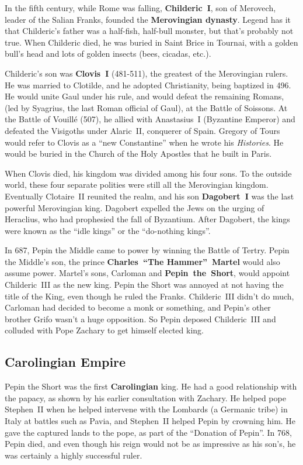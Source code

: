 In the fifth century, while Rome was falling,
\textbf{Childeric~I}, son of Merovech, leader of the Salian Franks, founded the \textbf{Merovingian dynasty}.
Legend has it that Childeric's father was a half-fish, half-bull monster, but that's probably not true.
When Childeric died, he was buried in Saint Brice in Tournai,
with a golden bull's head and lots of golden insects (bees, cicadas, etc.).

Childeric's son was \textbf{Clovis~I} (481-511), the greatest of the Merovingian rulers.
He was married to Clotilde, and he adopted Christianity, being baptized in 496.
He would unite Gaul under his rule, and would defeat the remaining Romans,
(led by Syagrius, the last Roman official of Gaul), at the Battle of Soissons.
At the Battle of Vouill\'e (507), he allied with Anastasius~I (Byzantine Emperor)
and defeated the Visigoths under Alaric~II, conquerer of Spain.
Gregory of Tours would refer to Clovis as a ``new Constantine'' when he wrote his \textit{Histories}.
He would be buried in the Church of the Holy Apostles that he built in Paris.

When Clovis died, his kingdom was divided among his four sons.
To the outside world, these four separate polities were still all the Merovingian kingdom.
Eventually Clotaire~II reunited the realm, and his son \textbf{Dagobert~I} was the last powerful Merovingian king.
Dagobert expelled the Jews on the urging of Heraclius, who had prophesied the fall of Byzantium.
After Dagobert, the kings were known as the ``idle kings'' or the ``do-nothing kings''.

In 687, Pepin the Middle came to power by winning the Battle of Tertry.
Pepin the Middle's son, the prince \textbf{Charles~``The Hammer''~Martel} would also assume power.
Martel's sons, Carloman and \textbf{Pepin~the~Short}, would appoint Childeric~III as the new king.
Pepin the Short was annoyed at not having the title of the King, even though he ruled the Franks.
Childeric~III didn't do much, Carloman had decided to become a monk or something,
and Pepin's other brother Grifo wasn't a huge opposition.
So Pepin deposed Childeric~III and colluded with Pope Zachary to get himself elected king.

\subsection*{Carolingian Empire}

Pepin the Short was the first \textbf{Carolingian} king.
He had a good relationship with the papacy, as shown by his earlier consultation with Zachary.
He helped pope Stephen~II when he helped intervene with the Lombards (a Germanic tribe)
in Italy at battles such as Pavia,
and Stephen~II helped Pepin by crowning him.
He gave the captured lands to the pope, as part of the ``Donation of Pepin''.
In 768, Pepin died, and even though his reign would not be as impressive as his son's,
he was certainly a highly successful ruler.

